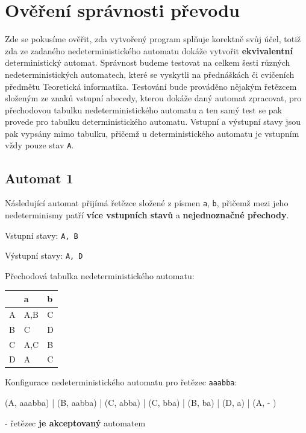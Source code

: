 \documentclass[11pt]{article}
\begin{document}
\newpage

\section{Ověření správnosti převodu}

Zde se pokusíme ověřit, zda vytvořený program splňuje korektně svůj účel, totiž zda ze zadaného nedeterministického automatu dokáže vytvořit \textbf{ekvivalentní} deterministický automat. Správnost budeme testovat na celkem šesti různých nedeterministických automatech, které se vyskytli na přednáškách či cvičeních předmětu Teoretická informatika. Testování bude prováděno nějakým řetězcem složeným ze znaků vstupní abecedy, kterou dokáže daný automat zpracovat, pro přechodovou tabulku nedeterministického automatu a ten samý test se pak provede pro tabulku deterministického automatu. Vstupní a výstupní stavy jsou pak vypsány mimo tabulku, přičemž u deterministického automatu je vstupním vždy pouze stav \texttt{A}.

\subsection{Automat 1}
Následující automat přijímá řetězce složené z písmen \texttt{a}, \texttt{b}, přičemž mezi jeho nedeterminismy patří  \textbf{více vstupních stavů} a  \textbf{nejednoznačné přechody}.

\bigskip

Vstupní stavy: \texttt{A, B}

Výstupní stavy: \texttt{A, D}

\bigskip

Přechodová tabulka nedeterministického automatu:

\bigskip

\begin{tabular}{| l | l | l |}
\hline
  & a & b \\ \hline
A & A,B & C \\ \hline
B & C & D \\ \hline
C & A,C & B \\ \hline
D & A & C \\
\hline
\end{tabular}

\bigskip

Konfigurace nedeterministického automatu pro řetězec \texttt{aaabba}:

(A, aaabba) | (B, aabba) | (C, abba) | (C, bba) | (B, ba) | (D, a) | (A, - )

- řetězec \textbf{je akceptovaný} automatem
\end{document}
